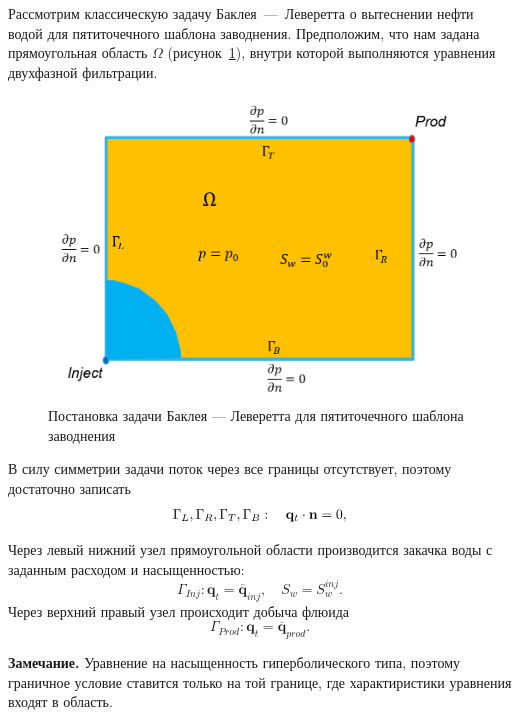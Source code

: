 Рассмотрим классическую задачу Баклея~---~Леверетта о вытеснении нефти водой для пятиточечного
шаблона заводнения. 
Предположим, что нам задана прямоугольная область $\Omega$ (рисунок~\ref{fig:ProblemInitBoundary}), 
внутри которой выполняются уравнения двухфазной фильтрации. 
\begin{figure}[H]
	\centering
	\includegraphics[width=1\linewidth]{img/ProblemInitBoundary}
	\caption{Постановка задачи Баклея --- Леверетта для пятиточечного шаблона заводнения}
	\label{fig:ProblemInitBoundary}
\end{figure}

В силу симметрии задачи поток через все границы отсутствует, поэтому достаточно записать
\begin{equation}
	\Gamma_L, \Gamma_R, \Gamma_T, \Gamma_B: \quad \mathbf{q}_t \cdot \mathbf{n} = 0,
\end{equation}

Через левый нижний узел прямоугольной области производится закачка воды с заданным 
расходом и насыщенностью:
\begin{equation}\label{eq:GammaL}
	\Gamma_{Inj}: \bm{q}_{t} = \overline{\bm{q}}_{inj}, \quad S_w = S_w^{inj}.
\end{equation}
Через верхний правый узел происходит добыча флюида
\begin{equation}\label{eq:GammaR}
	\Gamma_{Prod}: \bm{q}_{t} = \overline{\bm{q}}_{prod}.
\end{equation}


\textbf{Замечание.} Уравнение на насыщенность гиперболического типа, поэтому граничное 
условие ставится только на той границе, где характиристики уравнения входят в область.

